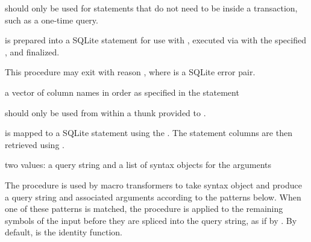  should only be used for statements that do not need to be inside a transaction, such as a one-time query.

 is prepared into a SQLite statement for use with , executed via  with the specified , and finalized.

This procedure may exit with reason , where  is a SQLite error pair.

\begin{procedure}
\end{procedure}
\returns{}
a vector of column names in order as specified in the  statement

 should only be used from within a thunk 
provided to .

 is mapped to a SQLite statement using the
. The statement columns are then retrieved
using .

\begin{procedure}\end{procedure}
\returns{} two values: a query string and a list of syntax objects for
the arguments

The  procedure is used by macro transformers to take
syntax object  and produce a query string and associated
arguments according to the patterns below.
When one of these patterns is matched, the  procedure is
applied to the remaining symbols of the input before they are spliced into the
query string, as if by .
By default,  is the identity function.


